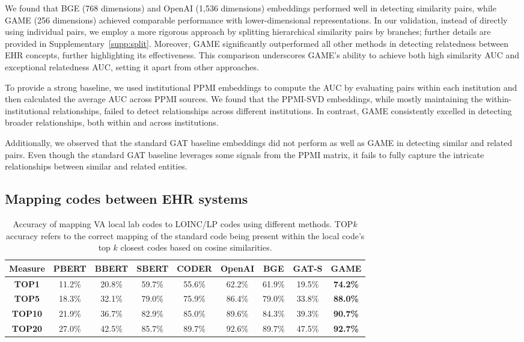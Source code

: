 \documentclass{article}
\begin{document}
We found that BGE (768 dimensions) and OpenAI (1,536 dimensions) embeddings performed well in detecting similarity pairs, while GAME (256 dimensions) achieved comparable performance with lower-dimensional representations.
In our validation, instead of directly using individual pairs,
we employ a more rigorous approach by splitting hierarchical similarity pairs by branches;
further details are provided in Supplementary~\ref{supp:split}.
Moreover, GAME significantly outperformed all other methods in detecting relatedness between EHR concepts, further highlighting its effectiveness.
This comparison underscores GAME's ability to achieve both high similarity AUC and exceptional relatedness AUC, setting it apart from other approaches.

To provide a strong baseline, we used institutional PPMI embeddings to compute the AUC by evaluating pairs within each institution and then calculated the average AUC across PPMI sources.
We found that the PPMI-SVD embeddings,
while mostly maintaining the within-institutional relationships,
failed to detect relationships across different institutions.
In contrast, GAME consistently excelled in detecting broader relationships, both within and across institutions.

Additionally, we observed that the standard GAT baseline embeddings did not perform as well as GAME in detecting similar and related pairs.
Even though the standard GAT baseline leverages some signals from the PPMI matrix, it fails to fully capture the intricate relationships between similar and related entities.

\subsection{Mapping codes between EHR systems} 

\begin{table}[H]
\centering
\setlength{\tabcolsep}{2pt}
\begin{tabular}{c|cccccccc}
\hline
\textbf{Measure} & PBERT& BBERT & SBERT &CODER & OpenAI  & BGE & GAT-S& GAME \\ \hline
\textbf{TOP1}     & 11.2\% &    20.8\%    & 59.7\%           & 55.6\%    & 62.2\%  & 61.9\% & 19.5\%  &\textbf{74.2\%}         \\ 
\textbf{TOP5}     & 18.3\% &    32.1\%    & 79.0\%           & 75.9\%    & 86.4\% & 79.0\%     & 33.8\%        & \textbf{88.0\%}        \\ 
\textbf{TOP10}     & 21.9\% &   36.7\%     & 82.9\%           & 85.0\%    & 89.6\%  & 84.3\%     & 39.3\%       & \textbf{90.7\%}         \\ 
\textbf{TOP20}      & 27.0\% &  42.5\%    & 85.7\%           & 89.7\%    & 92.6\%  & 89.7\%     & 47.5\%   & \textbf{92.7\%}        \\ \hline
\end{tabular}
\caption{Accuracy of mapping VA local lab codes to LOINC/LP codes using different methods.
TOP$k$ accuracy refers to the correct mapping of the standard code being present within the local code's top $k$ closest codes based on cosine similarities.}
\label{R1}
\end{table}
\end{document}
